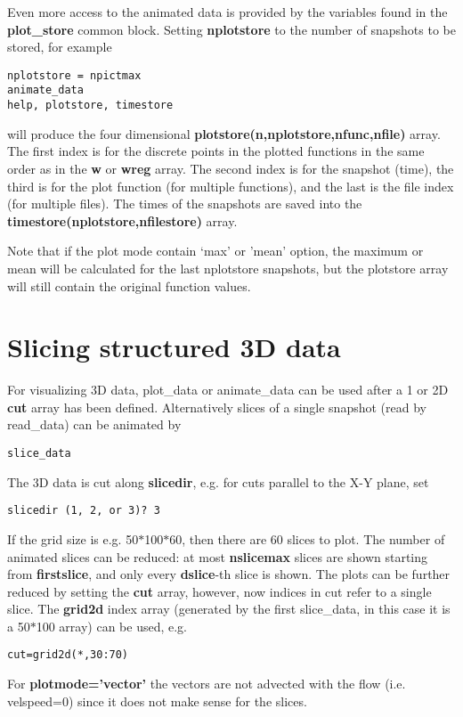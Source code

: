 \documentclass{article}
\begin{document}
Even more access to the animated data is provided by the variables found in the
{\bf plot\_store} common block. Setting {\bf nplotstore}
to the number of snapshots to be stored, for example
\begin{verbatim}
nplotstore = npictmax
animate_data
help, plotstore, timestore
\end{verbatim}
will produce the four dimensional {\bf plotstore(n,nplotstore,nfunc,nfile)} array.
The first index is for the discrete points in the plotted functions in the
same order as in the {\bf w} or {\bf wreg} array.
The second index is for the snapshot (time), the third is for the
plot function (for multiple functions), and the last is the file index 
(for multiple files).
The times of the snapshots are saved into the {\bf timestore(nplotstore,nfilestore)}
array. 

Note that if the plot mode contain `max' or 'mean' option, the 
maximum or mean will be calculated for the last nplotstore snapshots,
but the plotstore array will still contain the original function values.

\section{Slicing structured 3D data \label{s-slice}}

For visualizing 3D data, plot\_data or animate\_data can be used after a
1 or 2D {\bf cut} array has been defined. Alternatively slices of a single
snapshot (read by read\_data) can be animated by
\begin{verbatim}
slice_data
\end{verbatim}
The 3D data is cut along {\bf slicedir}, e.g. for cuts parallel to the
X-Y plane, set
\begin{verbatim}
slicedir (1, 2, or 3)? 3
\end{verbatim}
If the grid size is e.g. 50$*$100$*$60, then there are 60 slices to plot.
The number of animated slices can be reduced:
at most {\bf nslicemax} slices are shown starting from {\bf firstslice},
and only every {\bf dslice}-th slice is shown.
The plots can be further reduced by setting the {\bf cut} array,
however, now indices in cut refer to a single slice. The {\bf grid2d} 
index array (generated by the first slice\_data, in this case it is a 50$*$100 
array) can be used, e.g.
\begin{verbatim}
cut=grid2d(*,30:70)
\end{verbatim}
For {\bf plotmode='vector'} the vectors are not advected with the flow 
(i.e. velspeed=0) since it does not make sense for the slices.
\end{document}
